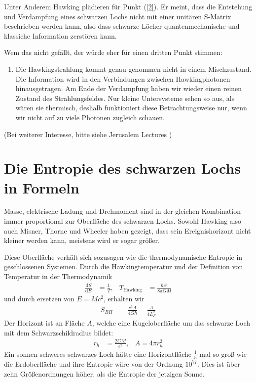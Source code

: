 \documentclass[ngerman]{scrartcl}
\newcommand{\diff}{\mathrm{d}}
\begin{document}
Unter Anderem Hawking plädieren für Punkt (\ref{2}). Er meint, dass die Entstehung und Verdampfung eines schwarzen Lochs nicht mit einer unitären S-Matrix beschrieben werden kann, also dass schwarze Löcher quantenmechanische und klassiche Information zerstören kann. 

Wem das nicht gefällt, der würde eher für einen dritten Punkt stimmen:
	\begin{enumerate}[(3)]
		\item Die Hawkingstrahlung kommt genau genommen nicht in einem Mischzustand. Die Information wird in den Verbindungen zwischen Hawkingphotonen hinausgetragen. Am Ende der Verdampfung haben wir wieder einen reinen Zustand des Strahlungsfeldes. Nur kleine Untersysteme sehen so aus, als wären sie thermisch, deshalb funktioniert diese Betrachtungsweise nur, wenn wir nicht auf zu viele Photonen zugleich schauen. 
	\end{enumerate}   
(Bei weiterer Interesse, bitte siehe Jerusalem Lectures \cite{JerusalemsLectures})

	
	\section{Die Entropie des schwarzen Lochs in Formeln}
	Masse, elektrische Ladung und Drehmoment sind in der gleichen Kombination immer proportional zur Oberfläche des schwarzen Lochs. Sowohl Hawking also auch Misner, Thorne und Wheeler haben gezeigt, dass sein Ereignishorizont nicht kleiner werden kann, meistens wird er sogar größer.
	
	Diese Oberfläche verhält sich sozusagen wie die thermodynamische Entropie in geschlossenen Systemen. 
	Durch die Hawkingtemperatur \cite{ParticleCreation} und der Definition von Temperatur in der Thermodynamik
		\begin{align}
			\frac{\diff S}{\diff E} &= \frac{1}{T},&
			T_{\text{Hawking}} &= \frac{\hbar c^3}{8 \pi G M}
		\end{align}
	und durch ersetzen von $E = Mc^2$, erhalten wir
		\begin{align} \label{BHentropie}
			S_{BH} &= \frac{c^3 A}{4 G \hbar} = \frac{A}{4 L_P^2} 
		\end{align}
	Der Horizont ist an Fläche $A$, welche eine Kugeloberfläche um das schwarze Loch mit dem Schwarzschildradius bildet:
		\begin{align}
			r_h &= \frac{2 GM}{c^2} ,& A = 4 \pi r_h^2 
		\end{align}
	Ein sonnen-schweres schwarzes Loch hätte eine Horizontfläche $\frac{1}{5}$-mal so groß wie die Erdoberfläche und ihre Entropie wäre von der Ordnung $10^{77}$. Dies ist über zehn Größenordnungen höher, als die Entropie der jetzigen Sonne.  
	
\end{document}
